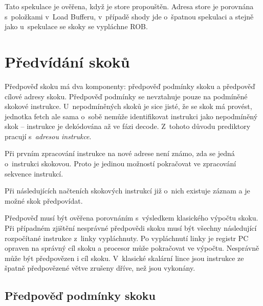 Tato spekulace je ověřena, když je store propouštěn.
Adresa store je porovnána s~položkami v~Load Bufferu, v~případě shody jde o~špatnou spekulaci a stejně jako u~spekulace se skoky se vypláchne ROB.


\section{Předvídání skoků}
\label{branchpredict}

Předpověď skoku má dva komponenty: předpověď podmínky skoku a předpověď cílové adresy skoku.
Předpověď podmínky se nevztahuje pouze na podmíněné skokové instrukce.
U~nepodmíněných skoků je sice jisté, že se skok má provést, jednotka fetch ale sama o~sobě nemůže identifikovat instrukci jako nepodmíněný skok -- instrukce je dekódována až ve fázi decode.
Z~tohoto důvodu prediktory pracují s~\emph{adresou instrukce}.

Při prvním zpracování instrukce na nové adrese není známo, zda se jedná o~instrukci skokovou.
Proto je jedinou možností pokračovat ve zpracování sekvence instrukcí.

Při následujících načteních skokových instrukcí již o~nich existuje záznam a je možné skok předpovídat.

Předpověď musí být ověřena porovnáním s~výsledkem klasického výpočtu skoku.
Při případném zjištění nesprávné předpovědi skoku musí být všechny následující rozpočítané instrukce z~linky vypláchnuty.
Po vypláchnutí linky je registr PC opraven na správný cíl skoku a procesor může pokračovat ve výpočtu.
Nesprávně může být předpovězen i cíl skoku.
V~klasické skalární lince jsou instrukce ze špatně předpovězené větve zrušeny dříve, než jsou vykonány.


\subsection{Předpověď podmínky skoku}

